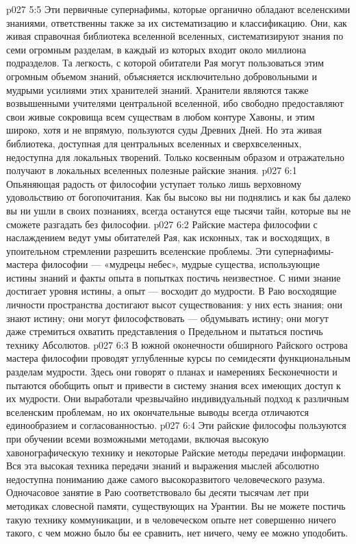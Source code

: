 \vs p027 5:5 Эти первичные супернафимы, которые органично обладают вселенскими знаниями, ответственны также за их систематизацию и классификацию. Они, как живая справочная библиотека вселенной вселенных, систематизируют знания по семи огромным разделам, в каждый из которых входит около миллиона подразделов. Та легкость, с которой обитатели Рая могут пользоваться этим огромным объемом знаний, объясняется исключительно добровольными и мудрыми усилиями этих хранителей знаний. Хранители являются также возвышенными учителями центральной вселенной, ибо свободно предоставляют свои живые сокровища всем существам в любом контуре Хавоны, и этим широко, хотя и не впрямую, пользуются суды Древних Дней. Но эта живая библиотека, доступная для центральных вселенных и сверхвселенных, недоступна для локальных творений. Только косвенным образом и отражательно получают в локальных вселенных полезные райские знания.
\vs p027 6:1 Опьяняющая радость от философии уступает только лишь верховному удовольствию от богопочитания. Как бы высоко вы ни поднялись и как бы далеко вы ни ушли в своих познаниях, всегда останутся еще тысячи тайн, которые вы не сможете разгадать без философии.
\vs p027 6:2 Райские мастера философии с наслаждением ведут умы обитателей Рая, как исконных, так и восходящих, в упоительном стремлении разрешить вселенские проблемы. Эти супернафимы\hyp{}мастера философии --- «мудрецы небес», мудрые существа, использующие истины знаний и факты опыта в попытках постичь неизвестное. С ними знание достигает уровня истины, а опыт --- восходит до мудрости. В Раю восходящие личности пространства достигают высот существования: у них есть знания; они знают истину; они могут философствовать --- обдумывать истину; они могут даже стремиться охватить представления о Предельном и пытаться постичь технику Абсолютов.
\vs p027 6:3 В южной оконечности обширного Райского острова мастера философии проводят углубленные курсы по семидесяти функциональным разделам мудрости. Здесь они говорят о планах и намерениях Бесконечности и пытаются обобщить опыт и привести в систему знания всех имеющих доступ к их мудрости. Они выработали чрезвычайно индивидуальный подход к различным вселенским проблемам, но их окончательные выводы всегда отличаются единообразием и согласованностью.
\vs p027 6:4 Эти райские философы пользуются при обучении всеми возможными методами, включая высокую хавонографическую технику и некоторые Райские методы передачи информации. Вся эта высокая техника передачи знаний и выражения мыслей абсолютно недоступна пониманию даже самого высокоразвитого человеческого разума. Одночасовое занятие в Раю соответствовало бы десяти тысячам лет при методиках словесной памяти, существующих на Урантии. Вы не можете постичь такую технику коммуникации, и в человеческом опыте нет совершенно ничего такого, с чем можно было бы ее сравнить, нет ничего, чему ее можно уподобить.
